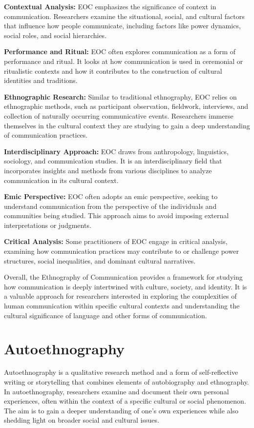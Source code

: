 \documentclass[
  b5paper]{book}
\begin{document}
\textbf{Contextual Analysis:} EOC emphasizes the significance of context in communication. Researchers examine the situational, social, and cultural factors that influence how people communicate, including factors like power dynamics, social roles, and social hierarchies.

\textbf{Performance and Ritual:} EOC often explores communication as a form of performance and ritual. It looks at how communication is used in ceremonial or ritualistic contexts and how it contributes to the construction of cultural identities and traditions.

\textbf{Ethnographic Research:} Similar to traditional ethnography, EOC relies on ethnographic methods, such as participant observation, fieldwork, interviews, and collection of naturally occurring communicative events. Researchers immerse themselves in the cultural context they are studying to gain a deep understanding of communication practices.

\textbf{Interdisciplinary Approach:} EOC draws from anthropology, linguistics, sociology, and communication studies. It is an interdisciplinary field that incorporates insights and methods from various disciplines to analyze communication in its cultural context.

\textbf{Emic Perspective:} EOC often adopts an emic perspective, seeking to understand communication from the perspective of the individuals and communities being studied. This approach aims to avoid imposing external interpretations or judgments.

\textbf{Critical Analysis:} Some practitioners of EOC engage in critical analysis, examining how communication practices may contribute to or challenge power structures, social inequalities, and dominant cultural narratives.

Overall, the Ethnography of Communication provides a framework for studying how communication is deeply intertwined with culture, society, and identity. It is a valuable approach for researchers interested in exploring the complexities of human communication within specific cultural contexts and understanding the cultural significance of language and other forms of communication.

\hypertarget{autoethnography}{%
\section{Autoethnography}\label{autoethnography}}

Autoethnography is a qualitative research method and a form of self-reflective writing or storytelling that combines elements of autobiography and ethnography. In autoethnography, researchers examine and document their own personal experiences, often within the context of a specific cultural or social phenomenon. The aim is to gain a deeper understanding of one's own experiences while also shedding light on broader social and cultural issues.
\end{document}
